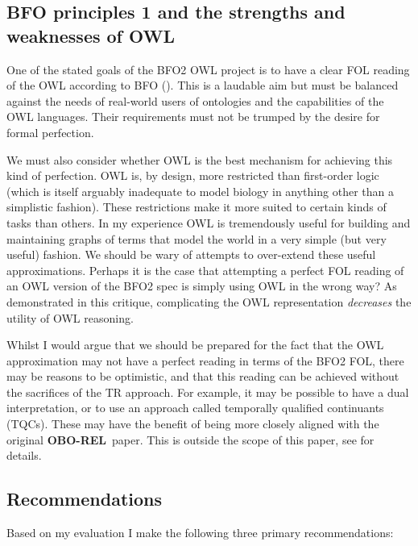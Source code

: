 \documentclass{bioinfo}
\def\P1{\pr{P-1}}
\def\OBOREL{\textbf{OBO-REL}}
\begin{document}
\subsection{BFO principles 1 and the strengths and weaknesses of OWL}

One of the stated goals of the BFO2 OWL project is to have a clear FOL
reading of the OWL according to BFO (\P1). This is a laudable aim but
must be balanced against the needs of real-world users of ontologies
and the capabilities of the OWL languages. Their requirements must
not be trumped by the desire for formal perfection.

We must also consider whether OWL is the best mechanism for achieving
this kind of perfection. OWL is, by design, more restricted than
first-order logic (which is itself arguably inadequate to model
biology in anything other than a simplistic fashion). These
restrictions make it more suited to certain kinds of tasks than
others. In my experience OWL is tremendously useful for building and
maintaining graphs of terms that model the world in a very simple (but
very useful) fashion. We should be wary of attempts to over-extend
these useful approximations. Perhaps it is the case that attempting a
perfect FOL reading of an OWL version of the BFO2 spec is simply using
OWL in the wrong way? As demonstrated in this critique, complicating
the OWL representation \emph{decreases} the utility of OWL reasoning.

Whilst I would argue that we should be prepared for the fact that the
OWL approximation may not have a perfect reading in terms of the BFO2
FOL, there may be reasons to be optimistic, and that this reading can
be achieved without the sacrifices of the TR approach. For example, it
may be possible to have a dual interpretation, or to use an approach
called temporally qualified continuants (TQCs). These may have the
benefit of being more closely aligned with the original \OBOREL\
paper. This is outside the scope of this paper, see \cite{Grewe} for
details.

\subsection{Recommendations}

Based on my evaluation I make the following three primary
recommendations:
\end{document}
